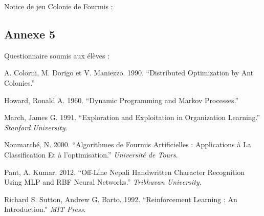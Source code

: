 \documentclass[
12pt,
french,
]{article}
\newenvironment{CSLReferences}%
  {}%
  {\par}
\begin{document}
\label{sec:annexe4}Notice de jeu Colonie de Fourmis :





\hypertarget{annexe-5}{%
\subsection{Annexe 5}\label{annexe-5}}

\label{sec:annexe5}Questionnaire soumis aux élèves :




\hypertarget{refs}{}
\begin{CSLReferences}{1}{0}
\leavevmode{}%
A. Colorni, M. Dorigo et V. Maniezzo. 1990. {``Distributed Optimization
by Ant Colonies.''}

\leavevmode{}%
Howard, Ronald A. 1960. {``Dynamic Programming and Markov Processes.''}

\leavevmode{}%
March, James G. 1991. {``Exploration and Exploitation in Organization
Learning.''} \emph{Stanford University}.

\leavevmode{}%
Nonmarché, N. 2000. {``Algorithmes de Fourmis Artificielles :
Applications à La Classification Et à l'optimisation.''}
\emph{Université de Tours}.

\leavevmode{}%
Pant, A. Kumar. 2012. {``Off-Line Nepali Handwritten Character
Recognition Using MLP and RBF Neural Networks.''} \emph{Tribhuvan
University}.

\leavevmode{}%
Richard S. Sutton, Andrew G. Barto. 1992. {``Reinforcement Learning : An
Introduction.''} \emph{MIT Press}.

\end{CSLReferences}

\listoftables
\newpage
\listoffigures
\lstlistoflistings
\end{document}
